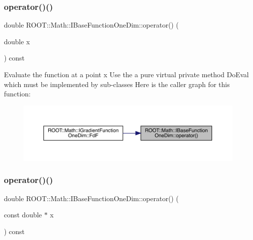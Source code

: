 \subsubsection{\texorpdfstring{operator()()}{operator()()}\hspace{0.1cm}{\footnotesize\ttfamily [2/4]}}
{\footnotesize\ttfamily double R\+O\+O\+T\+::\+Math\+::\+I\+Base\+Function\+One\+Dim\+::operator() (\begin{DoxyParamCaption}\item[{double}]{x }\end{DoxyParamCaption}) const\hspace{0.3cm}{\ttfamily [inline]}}

Evaluate the function at a point x Use the a pure virtual private method Do\+Eval which must be implemented by sub-\/classes Here is the caller graph for this function\+:\nopagebreak
\begin{figure}[H]
\begin{center}
\leavevmode
\includegraphics[width=350pt]{d0/dd5/classROOT_1_1Math_1_1IBaseFunctionOneDim_ac7f3be3ec5ab92d04ebb33f6615d59c2_icgraph}
\end{center}
\end{figure}
\mbox{\label{classROOT_1_1Math_1_1IBaseFunctionOneDim_ab99decfcf98d9b016322ebe85f4bc77a}} 
\subsubsection{\texorpdfstring{operator()()}{operator()()}\hspace{0.1cm}{\footnotesize\ttfamily [3/4]}}
{\footnotesize\ttfamily double R\+O\+O\+T\+::\+Math\+::\+I\+Base\+Function\+One\+Dim\+::operator() (\begin{DoxyParamCaption}\item[{const double $\ast$}]{x }\end{DoxyParamCaption}) const\hspace{0.3cm}{\ttfamily [inline]}}

